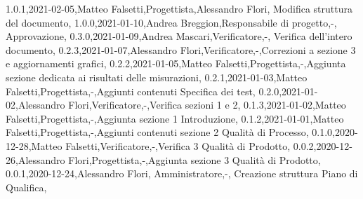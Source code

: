 {    {1.0.1,2021-02-05,Matteo Falsetti,Progettista,Alessandro Flori, Modifica struttura del documento},
    {1.0.0,2021-01-10,Andrea Breggion,Responsabile di progetto,-, Approvazione},
    {0.3.0,2021-01-09,Andrea Mascari,Verificatore,-, Verifica dell'intero documento},
    {0.2.3,2021-01-07,Alessandro Flori,Verificatore,-,Correzioni a sezione 3 e aggiornamenti grafici},
    {0.2.2,2021-01-05,Matteo Falsetti,Progettista,-,Aggiunta sezione dedicata ai risultati delle misurazioni},
    {0.2.1,2021-01-03,Matteo Falsetti,Progettista,-,Aggiunti contenuti Specifica dei test},
    {0.2.0,2021-01-02,Alessandro Flori,Verificatore,-,Verifica sezioni 1 e 2},
    {0.1.3,2021-01-02,Matteo Falsetti,Progettista,-,Aggiunta sezione 1 Introduzione},
    {0.1.2,2021-01-01,Matteo Falsetti,Progettista,-,Aggiunti contenuti sezione 2 Qualità di Processo},
    {0.1.0,2020-12-28,Matteo Falsetti,Verificatore,-,Verifica 3 Qualità di Prodotto},
    {0.0.2,2020-12-26,Alessandro Flori,Progettista,-,Aggiunta sezione 3 Qualità di Prodotto},
    {0.0.1,2020-12-24,Alessandro Flori, Amministratore,-, Creazione struttura Piano di Qualifica},
}

